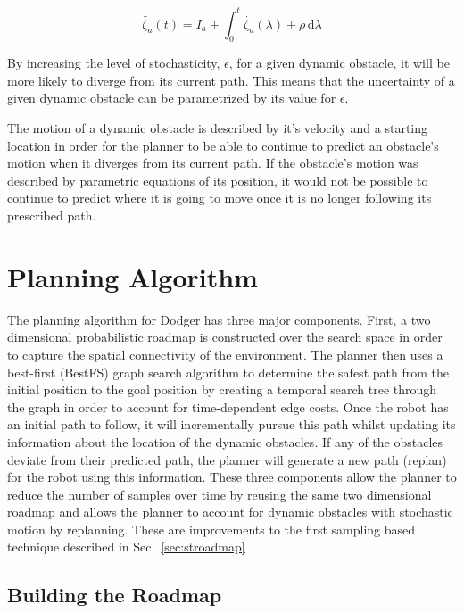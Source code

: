 \begin{equation}
    \tilde{\zeta_a}(t) = I_a + \int_{0}^{t} \dot{\zeta_a}(\lambda)
    + \rho \, \mathrm{d}\lambda
    \label{eq:obs_observed}
\end{equation}

By increasing the level of stochasticity, $\epsilon$, for a given dynamic
obstacle, it will be more likely to diverge from its current path. This means
that the uncertainty of a given dynamic obstacle can be parametrized by its
value for $\epsilon$.

The motion of a dynamic obstacle is described by it's velocity and a starting
location in order for the planner to be able to continue to predict an
obstacle's motion when it diverges from its current path. If the obstacle's
motion was described by parametric equations of its position, it would not be
possible to continue to predict where it is going to move once it is no longer
following its prescribed path.

\section{Planning Algorithm}

\label{sec:design_planner}

The planning algorithm for Dodger has three major components. First, a two
dimensional probabilistic roadmap is constructed over the search space in order
to capture the spatial connectivity of the environment. The planner then uses a
best-first (BestFS) graph search algorithm to determine the safest path from
the initial position to the goal position by creating a temporal search tree
through the graph in order to account for time-dependent edge costs. Once the
robot has an initial path to follow, it will incrementally pursue this path
whilst updating its information about the location of the dynamic obstacles. If
any of the obstacles deviate from their predicted path, the planner will
generate a new path (replan) for the robot using this information. These three
components allow the planner to reduce the number of samples over time by
reusing the same two dimensional roadmap and allows the planner to account for
dynamic obstacles with stochastic motion by replanning. These are improvements
to the first sampling based technique described in Sec.~\ref{sec:stroadmap}

\subsection{Building the Roadmap}

